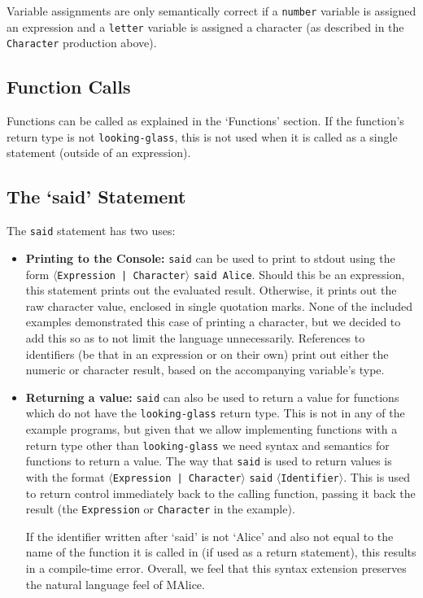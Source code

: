 \documentclass[a4wide, 11pt]{article}
\begin{document}
Variable assignments are only semantically correct if a \texttt{number} variable is assigned an expression and a \texttt{letter} variable is assigned a character (as described in the \texttt{Character} production above).

\subsection{Function Calls}

Functions can be called as explained in the `Functions' section. If the function's return type is not \texttt{looking-glass}, this is not used when it is called as a single statement (outside of an expression).

\subsection{The `said' Statement}

The \texttt{said} statement has two uses:
\begin{itemize}
\item \textbf{Printing to the Console:} \texttt{said} can be used to print to stdout using the form $\langle$\texttt{Expression | Character}$\rangle$ \texttt{said Alice}. Should this be an expression, this statement prints out the evaluated result. Otherwise, it prints out the raw character value, enclosed in single quotation marks. None of the included examples demonstrated this case of printing a character, but we decided to add this so as to not limit the language unnecessarily. References to identifiers (be that in an expression or on their own) print out either the numeric or character result, based on the accompanying variable's type.
\item \textbf{Returning a value:} \texttt{said} can also be used to return a value for functions which do not have the \texttt{looking-glass} return type. This is not in any of the example programs, but given that we allow implementing functions with a return type other than \texttt{looking-glass} we need syntax and semantics for functions to return a value. The way that \texttt{said} is used to return values is with the format $\langle$\texttt{Expression | Character}$\rangle$ \texttt{said} $\langle$\texttt{Identifier}$\rangle$. This is used to return control immediately back to the calling function, passing it back the result (the \texttt{Expression} or \texttt{Character} in the example).

If the identifier written after `said' is not `Alice' and also not equal to the name of the function it is called in (if used as a return statement), this results in a compile-time error. Overall, we feel that this syntax extension preserves the natural language feel of MAlice.
\end{itemize}
\end{document}
